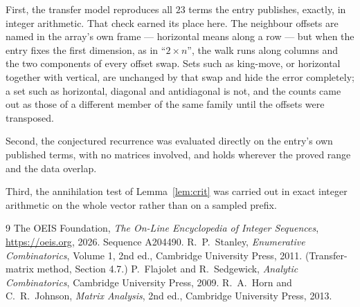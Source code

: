\documentclass[11pt,a4paper]{article}
\theoremstyle{plain}
\theoremstyle{definition}
\begin{document}
First, the transfer model reproduces all $23$ terms the entry publishes, exactly, in
integer arithmetic. That check earned its place here. The neighbour offsets are named in the
array's own frame --- horizontal means along a row --- but when the entry fixes the first
dimension, as in ``$2\times n$'', the walk runs along columns and the two components of every
offset swap. Sets such as king-move, or horizontal together with vertical, are unchanged by
that swap and hide the error completely; a set such as horizontal, diagonal and antidiagonal
is not, and the counts came out as those of a different member of the same family until the
offsets were transposed.

Second, the conjectured recurrence was evaluated directly on the entry's own published terms,
with no matrices involved, and holds wherever the proved range and the data overlap.

Third, the annihilation test of Lemma~\ref{lem:crit} was carried out in exact integer
arithmetic on the whole vector rather than on a sampled prefix.

\begin{thebibliography}{9}
 The OEIS Foundation, \emph{The On-Line Encyclopedia of Integer
Sequences}, \url{https://oeis.org}, 2026. Sequence A204490.
 R.~P.~Stanley, \emph{Enumerative Combinatorics}, Volume 1, 2nd ed.,
Cambridge University Press, 2011. (Transfer-matrix method, Section 4.7.)
 P.~Flajolet and R.~Sedgewick, \emph{Analytic Combinatorics}, Cambridge
University Press, 2009.
 R.~A.~Horn and C.~R.~Johnson, \emph{Matrix Analysis}, 2nd ed., Cambridge
University Press, 2013.
\end{thebibliography}
\end{document}
